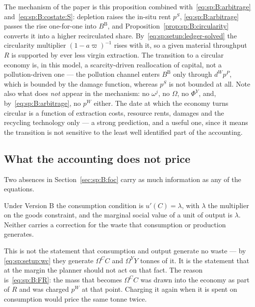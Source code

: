 The mechanism of the paper is this proposition combined with~\eqref{eq:sp:B:arbitrage}
and~\eqref{eq:sp:B:costate:S}: depletion raises the in-situ rent $p^S$, \eqref{eq:sp:B:arbitrage}
passes the rise one-for-one into $B^{\mathrm B}$, and Proposition~\ref{prop:sp:B:circularity} converts
it into a higher recirculated share. By~\eqref{eq:sp:setup:ledger-solved} the circularity multiplier
$\left(1-a\varpi\right)^{-1}$ rises with it, so a given material throughput $R$ is supported by ever
less virgin extraction. The transition to a circular economy is, in this model, a scarcity-driven
reallocation of capital, not a pollution-driven one --- the pollution channel enters
$B^{\mathrm B}$ only through $d^Wp^P$, which is bounded by the damage function, whereas $p^S$ is not
bounded at all. Note also what does \emph{not} appear in the mechanism: no $\omega^j$, no $\Omega$, no
$\Phi^Y$, and, by~\eqref{eq:sp:B:arbitrage}, no $p^W$ either. The date at which the economy turns
circular is a function of extraction costs, resource rents, damages and the recycling technology only
--- a strong prediction, and a useful one, since it means the transition is not sensitive to the least
well identified part of the accounting.


\subsection{What the accounting does not price}\label{sec:sp:B:nowedge}

Two absences in Section~\ref{sec:sp:B:foc} carry as much information as any of the equations.

\begin{proposition}\label{prop:sp:B:nowedge}
Under Version B the consumption condition is $u'(C)=\lambda$, with $\lambda$ the multiplier on the goods
constraint, and the marginal social value of a unit of output is $\lambda$. Neither carries a correction
for the waste that consumption or production generates.
\end{proposition}

This is not the statement that consumption and output generate no waste --- by \eqref{eq:sp:setup:wc}
they generate $\Omega^CC$ and $\Omega^YY$ tonnes of it. It is the statement that at the margin the
planner should not act on that fact. The reason is~\eqref{eq:sp:B:FR}: the mass that becomes
$\Omega^CC$ was drawn into the economy as part of $R$ and was charged $p^W$ at that point. Charging it
again when it is spent on consumption would price the same tonne twice.

